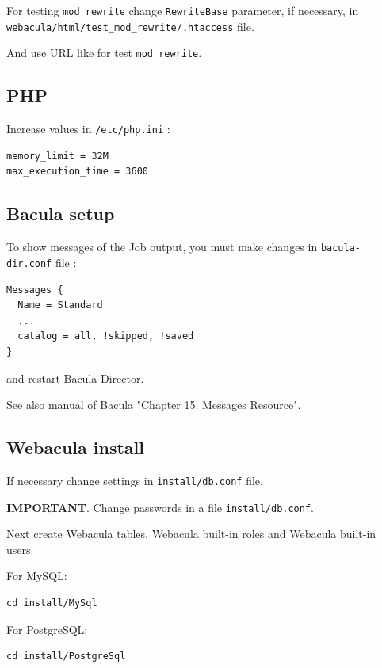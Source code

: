 \documentclass[10pt]{article}
\begin{document}
For testing \texttt{mod\_rewrite} change \texttt{RewriteBase} parameter, if necessary, in \texttt{webacula/html/test\_mod\_rewrite/.htaccess} file.

And use URL like
for test \texttt{mod\_rewrite}.


\subsection{PHP}
\label{Install:PHP}

Increase values in \texttt{/etc/php.ini} :
\begin{verbatim}
memory_limit = 32M
max_execution_time = 3600
\end{verbatim}



\subsection{Bacula setup}
\label{Install:Bacula setup}

To show messages of the Job output, you must make changes in \texttt{bacula-dir.conf} file :
\begin{verbatim}
Messages {
  Name = Standard
  ...
  catalog = all, !skipped, !saved
}
\end{verbatim}
and restart Bacula Director.

See also manual of Bacula "Chapter 15. Messages Resource".



\subsection{Webacula install}
\label{Install:Webacula install}

If necessary change settings in \texttt{install/db.conf} file.

\textbf{IMPORTANT}. Change passwords in a file \texttt{install/db.conf}.

Next create Webacula tables, Webacula built-in roles and Webacula built-in users.

For MySQL:
\begin{verbatim}
cd install/MySql
\end{verbatim}

For PostgreSQL:
\begin{verbatim}
cd install/PostgreSql
\end{verbatim}
\end{document}
